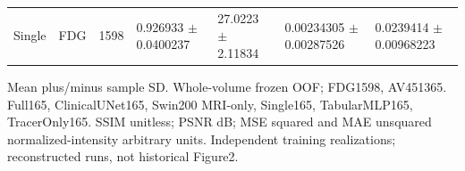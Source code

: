 \documentclass{article}
\begin{document}
\begin{landscape}
\begin{longtable}{lllllll}
Single & FDG & 1598 & 0.926933 \(\pm\) 0.0400237 & 27.0223 \(\pm\) 2.11834 & 0.00234305 \(\pm\) 0.00287526 & 0.0239414 \(\pm\) 0.00968223 \\
\end{longtable}
\noindent\parbox{\linewidth}{\footnotesize Mean plus/minus sample SD. Whole-volume frozen OOF; FDG1598, AV451365. Full165, ClinicalUNet165, Swin200 MRI-only, Single165, TabularMLP165, TracerOnly165. SSIM unitless; PSNR dB; MSE squared and MAE unsquared normalized-intensity arbitrary units. Independent training realizations; reconstructed runs, not historical Figure2.}
\endgroup
\end{landscape}



\end{document}
